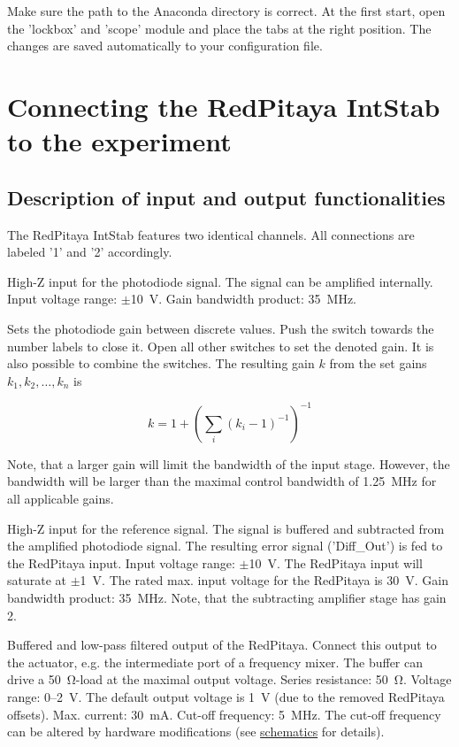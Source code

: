 \documentclass[twoside,a4paper]{refart}
\begin{document}
Make sure the path to the Anaconda directory is correct. At the first start, open the 'lockbox' and 'scope' module and place the tabs at the right position. The changes are saved automatically to your configuration file.

\section{Connecting the RedPitaya IntStab to the experiment}

\subsection{Description of input and output functionalities}
The RedPitaya IntStab features two identical channels. All connections are labeled '1' and '2' accordingly. 

High-Z input for the photodiode signal. The signal can be amplified internally. Input voltage range:  $\pm$\SI{10}{\volt}. Gain bandwidth product: \SI{35}{\mega\hertz}.


Sets the photodiode gain between discrete values. Push the switch towards the number labels to close it. Open all other switches to set the denoted gain. It is also possible to combine the switches. The resulting gain $k$ from the set gains $k_1, k_2, \dots, k_n$ is


	$$k = 1+ \left(\sum_i(k_i -1)^{-1}\right)^{-1}$$
	
Note, that a larger gain will limit the bandwidth of the input stage. However, the bandwidth will be larger than the maximal control bandwidth of \SI{1.25}{\mega\hertz} for all applicable gains. 



High-Z input for the reference signal. The signal is buffered and subtracted from the amplified photodiode signal. The resulting error signal ('Diff\_Out') is fed to the RedPitaya input. Input voltage range:  $\pm$\SI{10}{\volt}. The RedPitaya input will saturate at $\pm$\SI{1}{\volt}. The rated max. input voltage for the RedPitaya is \SI{30}{\volt}. Gain bandwidth product: \SI{35}{\mega\hertz}. Note, that the subtracting amplifier stage has gain 2.

Buffered and low-pass filtered output of the RedPitaya. Connect this output to the actuator, e.g. the intermediate port of a frequency mixer. The buffer can drive a \SI{50}{\ohm}-load at the maximal output voltage. Series resistance: \SI{50}{\ohm}.  Voltage range: 0--\SI{2}{\volt}. The default output voltage is \SI{1}{\volt} (due to the removed RedPitaya offsets).  Max. current: \SI{30}{\milli\ampere}. Cut-off frequency: \SI{5}{\mega\hertz}. The cut-off frequency can be altered by hardware modifications (see \href{https://github.com/TU-Darmstadt-APQ/RedPitaya-IntStab/tree/master/pcb}{schematics} for details).
\end{document}
